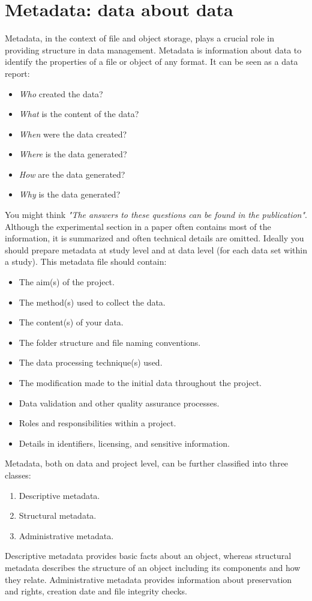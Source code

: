 
\section{Metadata: data about data}
Metadata, in the context of file and object storage, plays a crucial role in providing structure in data management. 
Metadata is information about data to identify the properties of a file or object of any format. It can be seen as a data report: 
\begin{itemize}
\item \textit{Who} created the data?
\item \textit{What} is the content of the data?
\item \textit{When} were the data created?
\item \textit{Where} is the data generated?
\item \textit{How} are the data generated?
\item \textit{Why} is the data generated?
\end{itemize}
You might think \textit{"The answers to these questions can be found in the publication"}. Although the experimental section in a paper often contains most of the information, it is summarized and often technical details are omitted. 
\whiteline
Ideally you should prepare metadata at study level and at data level (for each data set within a study). This metadata file should contain:
\begin{itemize}
\item The aim(s) of the project.
\item The method(s) used to collect the data.
\item The content(s) of your data.
\item The folder structure and file naming conventions.
\item The data processing technique(s) used.
\item The modification made to the initial data throughout the project.
\item Data validation and other quality assurance processes.
\item Roles and responsibilities within a project.
\item Details in identifiers, licensing, and sensitive information.
\end{itemize}
Metadata, both on data and project level, can be further classified into three classes:
\begin{enumerate}
\item Descriptive metadata.
\item Structural metadata.
\item Administrative metadata.
\end{enumerate}
Descriptive metadata provides basic facts about an object, whereas structural metadata describes the structure of an object including its components and how they relate. Administrative metadata provides information about preservation and rights, creation date and file integrity checks.
